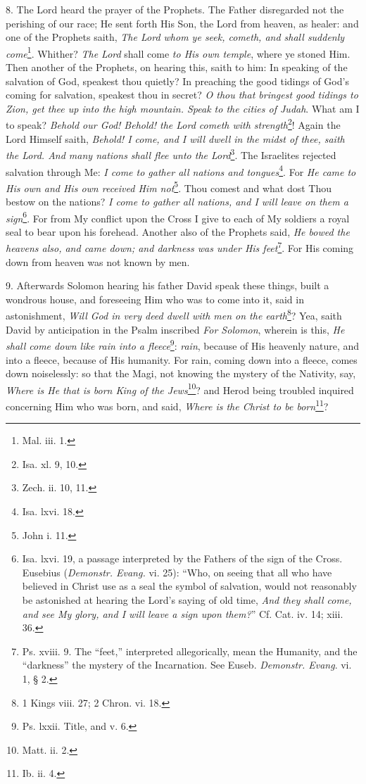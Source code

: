 8. The Lord heard the prayer of the Prophets. The Father disregarded not the perishing of our race; He sent forth His Son, the Lord from heaven, as healer: and one of the Prophets saith, \emph{The Lord whom ye seek, cometh, and shall suddenly come}\footnote{Mal. iii. 1.}. Whither? \emph{The Lord} shall come \emph{to His own temple}, where ye stoned Him. Then another of the Prophets, on hearing this, saith to him: In speaking of the salvation of God, speakest thou quietly? In preaching the good tidings of God’s coming for salvation, speakest thou in secret? \emph{O thou that bringest good tidings to Zion, get thee up into the high mountain. Speak to the cities of Judah}. What am I to speak? \emph{Behold our God! Behold! the Lord cometh with strength}\footnote{Isa. xl. 9, 10.}! Again the Lord Himself saith, \emph{Behold! I come, and I will dwell in the midst of thee, saith the Lord. And many nations shall flee unto the Lord}\footnote{Zech. ii. 10, 11.}. The Israelites rejected salvation through Me: \emph{I come to gather all nations and tongues}\footnote{Isa. lxvi. 18.}. For \emph{He came to His own and His own received Him not}\footnote{John i. 11.}. Thou comest and what dost Thou bestow on the nations? \emph{I come to gather all nations, and I will leave on them a sign}\footnote{Isa. lxvi. 19, a passage interpreted by the Fathers of the sign of the Cross. Eusebius (\emph{Demonstr. Evang.} vi. 25): “Who, on seeing that all who have believed in Christ use as a seal the symbol of salvation, would not reasonably be astonished at hearing the Lord’s saying of old time, \emph{And they shall come, and see My glory, and I will leave a sign upon them?}” Cf. Cat. iv. 14; xiii. 36.}. For from My conflict upon the Cross I give to each of My soldiers a royal seal to bear upon his forehead. Another also of the Prophets said, \emph{He bowed the heavens also, and came down; and darkness was under His feet}\footnote{Ps. xviii. 9. The “feet,” interpreted allegorically, mean the Humanity, and the “darkness” the mystery of the Incarnation. See Euseb. \emph{Demonstr. Evang}. vi. 1, § 2.}. For His coming down from heaven was not known by men.

9. Afterwards Solomon hearing his father David speak these things, built a wondrous house, and foreseeing Him who was to come into it, said in astonishment, \emph{Will God in very deed dwell with men on the earth}\footnote{1 Kings viii. 27; 2 Chron. vi. 18.}? Yea, saith David by anticipation in the Psalm inscribed \emph{For Solomon}, wherein is this, \emph{He shall come down like rain into a fleece}\footnote{Ps. lxxii. Title, and v. 6.}: \emph{rain}, because of His heavenly nature, and into a fleece, because of His humanity. For rain, coming down into a fleece, comes down noiselessly: so that the Magi, not knowing the mystery of the Nativity, say, \emph{Where is He that is born King of the Jews}\footnote{Matt. ii. 2.}? and Herod being troubled inquired concerning Him who was born, and said, \emph{Where is the Christ to be born}\footnote{Ib. ii. 4.}?

